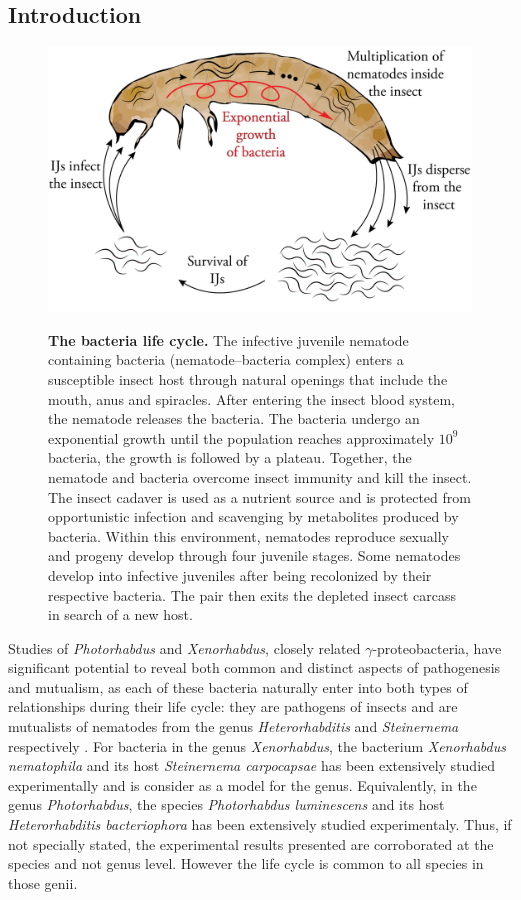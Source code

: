 \documentclass[10pt]{article}
\newcommand{\Xenonema}{\textit{Xenorhabdus nematophila} }
\newcommand{\Steincarpo}{\textit{Steinernema carpocapsae} }
\newcommand{\Stein}{\textit{Steinernema} }
\newcommand{\Photo}{\textit{Photorhabdus} }
\newcommand{\Hetero}{\textit{Heterorhabditis} }
\begin{document}
\begin{multicols}{2}
\section*{Introduction}
\begin{figure}[hbt!]
	  \centering
	  \label{fig:life_cycle}
       \includegraphics[width=14.0cm]{Figures/life_cycle.png}\\
		\caption{ \textbf{ The bacteria life cycle.} 
		The infective juvenile nematode containing bacteria (nematode–bacteria complex) enters a susceptible insect host through natural openings that include the mouth, anus and spiracles. 
		After entering the insect blood system, the nematode releases the bacteria. 
		The bacteria undergo an exponential growth until the population reaches approximately $10^9$ bacteria, the growth is followed by a plateau. 
		Together, the nematode and bacteria overcome insect immunity and kill the insect. 
		The insect cadaver is used as a nutrient source and is protected from opportunistic infection and scavenging by metabolites produced by bacteria.  
		Within this environment, nematodes reproduce sexually and progeny develop through four juvenile stages. 
		Some nematodes develop into infective juveniles after being recolonized by their respective bacteria. 
		The pair then exits the depleted insect carcass in search of a new host.}
\end{figure}
Studies of \Photo and \textit{Xenorhabdus}, closely related $\gamma$-proteobacteria, have significant potential to reveal both common and distinct aspects of pathogenesis and mutualism, as each of these bacteria naturally enter into both types of relationships during their life cycle: they are pathogens of insects and are mutualists of nematodes from the genus \Hetero and \Stein respectively \cite{Herbert2007,Akhurst1982a,Somvanshi2012}. 
For bacteria in the genus \textit{Xenorhabdus}, the bacterium \Xenonema and its host \Steincarpo has been extensively studied experimentally and is consider as a model for the genus. 
Equivalently, in the genus \textit{Photorhabdus}, the species \textit{Photorhabdus luminescens} and its host \textit{Heterorhabditis bacteriophora} has been extensively studied experimentaly. 
Thus, if not specially stated, the experimental results presented are corroborated at the species and not genus level. However the life cycle is common to all species in those genii.


\end{multicols}
\end{document}

